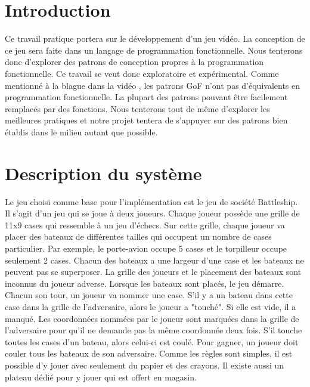 \documentclass[12pt]{article}
\begin{document}
\section{Introduction}

Ce travail pratique portera sur le développement d'un jeu vidéo. La conception de ce jeu sera faite dans un langage de programmation fonctionnelle. Nous tenterons donc d'explorer des patrons de conception propres à la programmation fonctionnelle. Ce travail se veut donc exploratoire et expérimental. Comme mentionné à la blague dans la vidéo \cite{functional_video}, les patrons GoF n'ont pas d'équivalents en programmation fonctionnelle. La plupart des patrons pouvant être facilement remplacés par des fonctions. Nous tenterons tout de même d'explorer les meilleures pratiques et notre projet tentera de s'appuyer sur des patrons bien établis dans le milieu autant que possible.

\section{Description du système} 

Le jeu choisi comme base pour l'implémentation est le jeu de société Battleship. Il s'agit d'un jeu qui se joue à deux joueurs. Chaque joueur possède une grille de 11x9 cases qui ressemble à un jeu d'échecs. Sur cette grille, chaque joueur va placer des bateaux de différentes tailles qui occupent un nombre de cases particulier. Par exemple, le porte-avion occupe 5 cases et le torpilleur occupe seulement 2 cases. Chacun des bateaux a une largeur d'une case et les bateaux ne peuvent pas se superposer. La grille des joueurs et le placement des bateaux sont inconnus du joueur adverse. Lorsque les bateaux sont placés, le jeu démarre. Chacun son tour, un joueur va nommer une case. S’il y a un bateau dans cette case dans la grille de l'adversaire, alors le joueur a "touché". Si elle est vide, il a manqué. Les coordonnées nommées par le joueur sont marquées dans la grille de l'adversaire pour qu'il ne demande pas la même coordonnée deux fois. S'il touche toutes les cases d'un bateau, alors celui-ci est coulé. Pour gagner, un joueur doit couler tous les bateaux de son adversaire. Comme les règles sont simples, il est possible d'y jouer avec seulement du papier et des crayons. Il existe aussi un plateau dédié pour y jouer qui est offert en magasin. 
\end{document}
